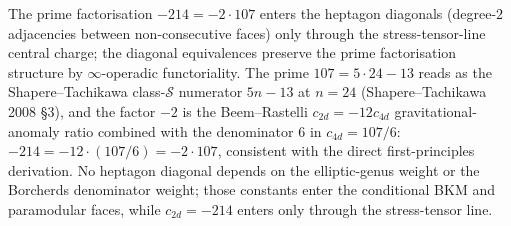 \begin{remark}
\label{rem:schtop-heptagon-factorisation}
The prime factorisation $-214 = -2\cdot 107$ enters the heptagon
diagonals (degree-$2$ adjacencies between non-consecutive faces)
only through the stress-tensor-line central charge; the diagonal
equivalences preserve the prime factorisation structure by
$\infty$-operadic functoriality. The prime $107 = 5\cdot 24 - 13$
reads as the Shapere--Tachikawa class-$\mathcal S$ numerator
$5n - 13$ at $n = 24$ (Shapere--Tachikawa 2008 \S 3), and the
factor $-2$ is the Beem--Rastelli $c_{2d} = -12 c_{4d}$
gravitational-anomaly ratio combined with the denominator $6$ in
$c_{4d} = 107/6$: $-214 = -12\cdot(107/6) = -2\cdot 107$,
consistent with the direct first-principles derivation. No
heptagon diagonal depends on the elliptic-genus weight or the
Borcherds denominator weight; those constants enter the conditional
BKM and paramodular faces, while $c_{2d}=-214$ enters only through the
stress-tensor line.
\end{remark}
